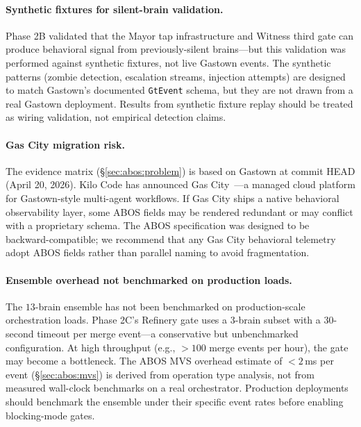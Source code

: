 \paragraph{Synthetic fixtures for silent-brain validation.}
Phase 2B validated that the Mayor tap infrastructure and Witness third gate
can produce behavioral signal from previously-silent brains---but this
validation was performed against synthetic fixtures, not live Gastown
events. The synthetic patterns (zombie detection, escalation streams,
injection attempts) are designed to match Gastown's documented
\texttt{GtEvent} schema, but they are not drawn from a real Gastown
deployment. Results from synthetic fixture replay should be treated as
wiring validation, not empirical detection claims.

\paragraph{Gas City migration risk.}
The evidence matrix (\S\ref{sec:abos:problem}) is based on Gastown at
commit HEAD (April 20, 2026). Kilo Code has announced
Gas City~\cite{kilocode2026gasCity}---a managed cloud platform for
Gastown-style multi-agent workflows. If Gas City ships a native behavioral
observability layer, some ABOS fields may be rendered redundant or may
conflict with a proprietary schema. The ABOS specification was designed to
be backward-compatible; we recommend that any Gas City behavioral telemetry
adopt ABOS fields rather than parallel naming to avoid fragmentation.

\paragraph{Ensemble overhead not benchmarked on production loads.}
The $13$-brain ensemble has not been benchmarked on production-scale
orchestration loads. Phase 2C's Refinery gate uses a $3$-brain subset
with a $30$-second timeout per merge event---a conservative but unbenchmarked
configuration. At high throughput (e.g., $> 100$ merge events per hour),
the gate may become a bottleneck. The ABOS MVS overhead estimate of
$< 2$\,ms per event (\S\ref{sec:abos:mvs}) is derived from operation type
analysis, not from measured wall-clock benchmarks on a real orchestrator.
Production deployments should benchmark the ensemble under their specific
event rates before enabling blocking-mode gates.

